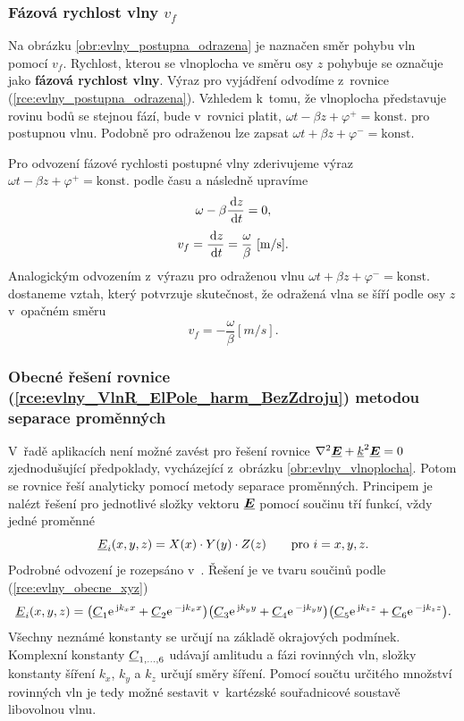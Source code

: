 \subsubsection*{Fázová rychlost vlny $v_{f}$}
Na obrázku \ref{obr:evlny_postupna_odrazena} je naznačen směr pohybu vln pomocí $v_{f}$. Rychlost, kterou se vlnoplocha ve směru osy $z$ pohybuje se označuje jako {\bf fázová rychlost vlny}. Výraz pro vyjádření odvodíme z~rovnice (\ref{rce:evlny_postupna_odrazena}). Vzhledem k~tomu, že vlnoplocha představuje rovinu bodů se stejnou fází, bude v~rovnici platit, $\omega t - \beta z + \varphi^{+} = \mathrm{konst.}$ pro postupnou vlnu. Podobně pro odraženou lze zapsat $\omega t + \beta z + \varphi^{-} = \mathrm{konst.}$

Pro odvození fázové rychlosti postupné vlny zderivujeme výraz $\omega t - \beta z + \varphi^{+} = \mathrm{konst.}$ podle času a následně upravíme
\begin{displaymath}
	\omega - \beta \frac{\,\mathrm{d} z}{\,\mathrm{d} t} = 0,
\end{displaymath}
\begin{displaymath}
	v_{f} = \frac{\,\mathrm{d} z}{\,\mathrm{d} t} = \frac{\omega}{\beta}\mathrm{\ [m/s]}.
\end{displaymath}
Analogickým odvozením z~výrazu pro odraženou vlnu  $\omega t + \beta z + \varphi^{-} = \mathrm{konst.}$ dostaneme vztah, který potvrzuje skutečnost, že odražená vlna se šíří podle osy $z$ v~opačném směru 
\begin{displaymath}
	v_{f} = - \frac{\omega}{\beta}\unit{[m/s]}.
\end{displaymath}

\subsubsection*{Obecné řešení rovnice (\ref{rce:evlny_VlnR_ElPole_harm_BezZdroju}) metodou separace proměnných}
V~řadě aplikacích není možné zavést pro řešení rovnice $\nabla^{2}\mbox{\underline{\boldmath$E$}} +{\underline{k}}^{2}\mbox{\underline{\boldmath$E$}} = 0$  zjednodušující předpoklady, vycházející z~obrázku \ref{obr:evlny_vlnoplocha}. Potom se rovnice řeší analyticky pomocí metody separace proměnných. Principem je nalézt řešení pro jednotlivé složky vektoru $\mbox{\underline{\boldmath$E$}}$ pomocí součinu tří funkcí, vždy jedné proměnné
\begin{equation}
	{\underline{E}}_{i}(x,y,z) = X(x)\cdot Y(y)\cdot Z(z)\qquad\mathrm{pro}\ i = x, y, z.
	\label{rce:evlny_obecne_xyz}
\end{equation}
Podrobné odvození je rozepsáno v~\cite[str. 50]{emp}. Řešení je ve tvaru součinů podle (\ref{rce:evlny_obecne_xyz})
\begin{equation}
	{\underline{E}}_{i}(x,y,z) = \big( {\underline{C}}_{1}\mathrm{e\,}^{\mathrm{j} k_{x}x} +{\underline{C}}_{2}\mathrm{e\,}^{-\mathrm{j} k_{x}x} \big)\big({\underline{C}}_{3}\mathrm{e\,}^{\mathrm{j} k_{y}y} + {\underline{C}}_{4}\mathrm{e\,}^{-\mathrm{j} k_{y}y} \big)\big({\underline{C}}_{5}\mathrm{e\,}^{\mathrm{j} k_{z}z} + {\underline{C}}_{6}\mathrm{e\,}^{-\mathrm{j} k_{z}z} \big).
	\label{rce:evlny_obecne_reseni}
\end{equation}
Všechny neznámé konstanty se určují na základě okrajových podmínek. Komplexní konstanty ${\underline{C}}_{1,\ldots,6}$ udávají amlitudu a fázi rovinných vln, složky konstanty šíření $k_{x}$, $k_{y}$ a $k_{z}$ určují směry šíření. Pomocí součtu určitého množství rovinných vln je tedy možné sestavit v~kartézské souřadnicové soustavě libovolnou vlnu.

